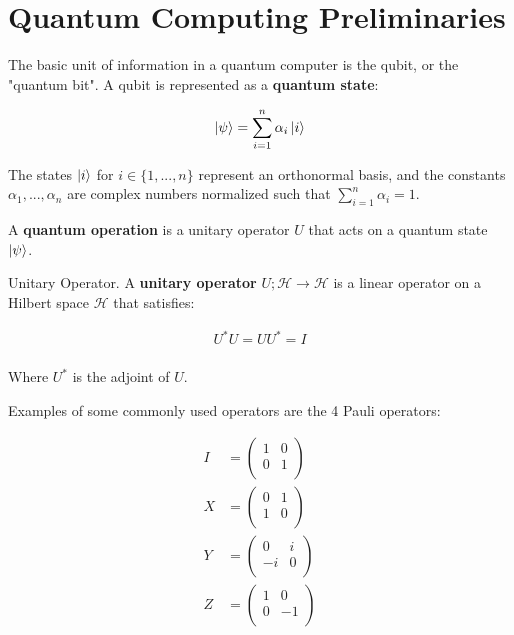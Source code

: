 \section{Quantum Computing Preliminaries}
\label{sec:qc}

The basic unit of information in a quantum computer is the qubit, or the "quantum bit". A qubit is represented as a \textbf{quantum state}:

\begin{align*}
    \ket{\psi} &= \sum_{i=1}^n \alpha_i\ket{i} \\ 
\end{align*}

The states $\ket{i}$ for $i \in \{1,...,n\}$ represent an orthonormal basis, and the constants $\alpha_1,...,\alpha_n$ are complex numbers normalized such that $\sum_{i=1}^n \alpha_i = 1$.

A \textbf{quantum operation} is a unitary operator $U$ that acts on a quantum state $\ket{\psi}$.

\begin{definition}{Unitary Operator.}
    A \textbf{unitary operator} $U;\mathcal{H} \to \mathcal{H}$ is a linear operator on a Hilbert space $\mathcal{H}$ that satisfies:
    
    \begin{align*}
        U^*U = UU^* = I \\ 
    \end{align*}
    
    Where $U^*$ is the adjoint of $U$.
\end{definition}

Examples of some commonly used operators are the 4 Pauli operators:

\begin{align*}
    I &= \begin{pmatrix}
        1 & 0 \\ 
        0 & 1 \\ 
    \end{pmatrix} \\ 
    X &= \begin{pmatrix}
        0 & 1 \\ 
        1 & 0 \\ 
    \end{pmatrix} \\ 
    Y &= \begin{pmatrix}
        0 & i \\ 
        -i & 0 \\ 
    \end{pmatrix} \\ 
    Z &= \begin{pmatrix}
        1 & 0 \\ 
        0 & -1 \\ 
    \end{pmatrix} \\ 
\end{align*}

